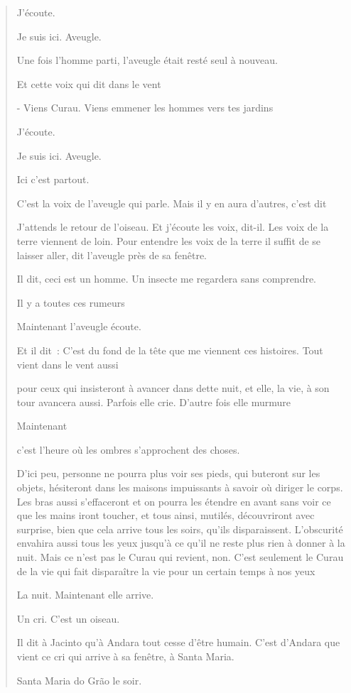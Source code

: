 \begin{quote}
J'écoute.

Je suis ici. Aveugle.

Une fois l'homme parti, l'aveugle était resté seul à nouveau.

Et cette voix qui dit dans le vent

- Viens Curau. Viens emmener les hommes vers tes jardins

J'écoute.

Je suis ici. Aveugle.

Ici c'est partout.

C'est la voix de l'aveugle qui parle. Mais il y en aura d'autres, c'est
dit

J'attends le retour de l'oiseau. Et j'écoute les voix, dit-il. Les voix
de la terre viennent de loin. Pour entendre les voix de la terre il
suffit de se laisser aller, dit l'aveugle près de sa fenêtre.

Il dit, ceci est un homme. Un insecte me regardera sans comprendre.

Il y a toutes ces rumeurs

Maintenant l'aveugle écoute.

Et il dit~: C'est du fond de la tête que me viennent ces histoires. Tout
vient dans le vent aussi

pour ceux qui insisteront à avancer dans dette nuit, et elle, la vie, à
son tour avancera aussi. Parfois elle crie. D'autre fois elle murmure

Maintenant

c'est l'heure où les ombres s'approchent des choses.

D'ici peu, personne ne pourra plus voir ses pieds, qui buteront sur les
objets, hésiteront dans les maisons impuissants à savoir où diriger le
corps. Les bras aussi s'effaceront et on pourra les étendre en avant
sans voir ce que les mains iront toucher, et tous ainsi, mutilés,
découvriront avec surprise, bien que cela arrive tous les soirs, qu'ils
disparaissent. L'obscurité envahira aussi tous les yeux jusqu'à ce qu'il
ne reste plus rien à donner à la nuit. Mais ce n'est pas le Curau qui
revient, non. C'est seulement le Curau de la vie qui fait disparaître la
vie pour un certain temps à nos yeux

La nuit. Maintenant elle arrive.

Un cri. C'est un oiseau.

Il dit à Jacinto qu'à Andara tout cesse d'être humain. C'est d'Andara
que vient ce cri qui arrive à sa fenêtre, à Santa Maria.

Santa Maria do Grão le soir.


\end{quote}
